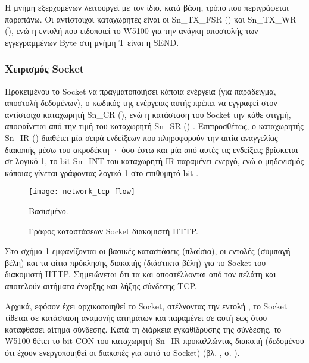 Η μνήμη εξερχομένων λειτουργεί με τον ίδιο, κατά βάση, τρόπο που περιγράφεται
παραπάνω. Οι αντίστοιχοι καταχωρητές είναι οι Sn\_TX\_FSR () και Sn\_TX\_WR (), ενώ η εντολή
που ειδοποιεί το W5100 για την ανάγκη αποστολής των εγγεγραμμένων Byte στη μνήμη
T είναι η SEND.


\subsubsection{Χειρισμός Socket}

Προκειμένου το Socket να πραγματοποιήσει κάποια ενέργεια (για παράδειγμα,
αποστολή δεδομένων), ο κωδικός της ενέργειας αυτής πρέπει να εγγραφεί στον
αντίστοιχο καταχωρητή Sn\_CR (), ενώ η κατάσταση
του Socket την κάθε στιγμή, αποφαίνεται από την τιμή του καταχωρητή Sn\_SR
() \parencite[26--30]{wiz11:w5100}. Επιπροσθέτως, ο
καταχωρητής Sn\_IR () διαθέτει μία σειρά
ενδείξεων που πληροφορούν την αιτία αναγγελίας διακοπής μέσω του ακροδέκτη
· όσο έστω και μία από αυτές τις ενδείξεις βρίσκεται σε λογικό 1, το
bit Sn\_INT του καταχωρητή IR παραμένει ενεργό, ενώ ο μηδενισμός κάποιας γίνεται
γράφοντας λογικό 1 στο επιθυμητό bit \parencite[27]{wiz11:w5100}.

\begin{figure}
    \caption{Γράφος καταστάσεων Socket διακομιστή HTTP.
    \label{fig:network:tcp-flow}}
    \begin{center}
    \texttt{[image: network\_tcp-flow]}
    \end{center}
    Βασισμένο. 
\end{figure}

Στο σχήμα \ref{fig:network:tcp-flow} εμφανίζονται οι βασικές καταστάσεις
(πλαίσια), οι εντολές (συμπαγή βέλη) και τα αίτια πρόκλησης διακοπής (διάστικτα
βέλη) για το Socket του διακομιστή HTTP. Σημειώνεται ότι τα 
και  αποστέλλονται από τον πελάτη και αποτελούν αιτήματα
έναρξης και λήξης σύνδεσης TCP.

Αρχικά, εφόσον έχει αρχικοποιηθεί το Socket, στέλνοντας την εντολή ,
το Socket τίθεται σε κατάσταση αναμονής αιτημάτων και παραμένει σε αυτή έως ότου
καταφθάσει αίτημα σύνδεσης. Κατά τη διάρκεια εγκαθίδρυσης της σύνδεσης, το W5100
θέτει το bit CON του καταχωρητή Sn\_IR προκαλλώντας διακοπή (δεδομένου ότι έχουν
ενεργοποιηθεί οι διακοπές για αυτό το Socket) (βλ.
, σ. \pageref{ssubsec:network:ir_imr}).

